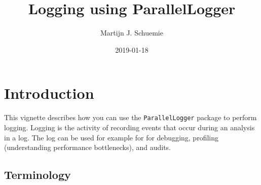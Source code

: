 \documentclass[]{article}
\title{Logging using ParallelLogger}
\author{Martijn J. Schuemie}
\date{2019-01-18}
\begin{document}
\maketitle

{
\setcounter{tocdepth}{2}
\tableofcontents
}
\hypertarget{introduction}{%
\section{Introduction}\label{introduction}}

This vignette describes how you can use the \texttt{ParallelLogger}
package to perform logging. Logging is the activity of recording events
that occur during an analysis in a log. The log can be used for example
for for debugging, profiling (understanding performance bottlenecks),
and audits.

\hypertarget{terminology}{%
\subsection{Terminology}\label{terminology}}
\end{document}
